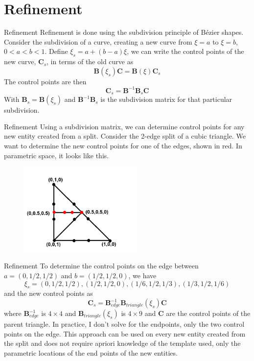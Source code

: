 \documentclass[12pt]{beamer}
\newcommand{\spa}{\vspace{0.5cm}\newline}
\begin{document}
\section{Refinement}
\begin{frame}{Refinement}
Refinement is done using the subdivision principle of B{\'e}zier shapes. Consider the subdivision of a curve, creating a new curve from $\xi = a$ to $\xi = b$, $0 < a < b < 1$. Define $\xi_s = a+(b-a)\xi$, we can write the control points of the new curve, $\mathbf{C}_s$, in terms of the old curve as
\[
\mathbf{B}(\xi_s)\mathbf{C} = \mathbf{B}(\xi)\mathbf{C}_s
\]
The control points are then 
\[ 
\mathbf{C}_s = \mathbf{B}^{-1}\mathbf{B}_s \mathbf{C}
\]
With $\mathbf{B}_s = \mathbf{B}(\xi_s)$ and $\mathbf{B}^{-1}\mathbf{B}_s$ is the subdivision matrix for that particular subdivision.
\end{frame}
\begin{frame}{Refinement}
Using a subdivision matrix, we can determine control points for any new entity created from a split. Consider the 2-edge split of a cubic triangle. We want to determine the new control points for one of the edges, shown in red. In parametric space, it looks like this.
\begin{figure}
  \centering
  \includegraphics[width=0.55\textwidth]{bezier_images/refine1.png} 
\end{figure}
\end{frame}
\begin{frame}{Refinement}
To determine the control points on the edge between $a = (0,1/2,1/2)$ and $b = (1/2,1/2,0)$, we have \[\xi_s = (0,1/2,1/2), (1/2,1/2,0), (1/6,1/2,1/3), (1/3,1/2,1/6) \]
and the new control points as
\[ \mathbf{C}_s = \mathbf{B}^{-1}_{edge}\mathbf{B}_{triangle}(\xi_s) \mathbf{C} \]
where $\mathbf{B}_{edge}^{-1}$ is $4 \times 4$ and $\mathbf{B}_{triangle}(\xi_s)$ is $4 \times 9$ and $\mathbf{C}$ are the control points of the parent triangle. In practice, I don't solve for the endpoints, only the two control points on the edge. \spa
This approach can be used on every new entity created from the split and does not require apriori knowledge of the template used, only the parametric locations of the end points of the new entities.
\end{frame}
\end{document}
